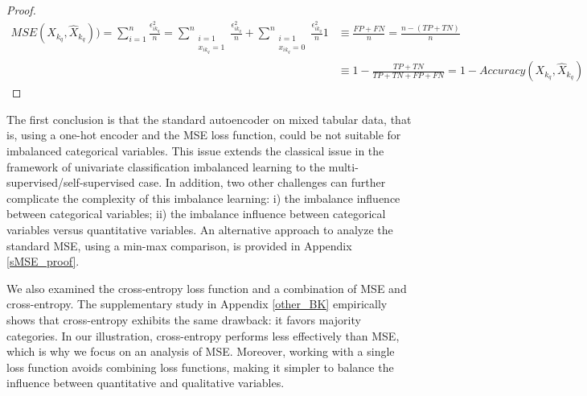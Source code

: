 \documentclass{article}
\def \w {\widehat}
\theoremstyle{definition}
\begin{document}
\begin{proof}
{\small
    \begin{align*}
        MSE(X_{k_q},  \w X_{k_q})) = \sum_{i=1}^n  \frac{\epsilon_{ik_q}^2}{n}  =  \underset{\substack{i=1 \\ x_{ik_q}=1}}{\sum^n}   \frac{\epsilon_{ik_q}^2}{n} + \underset{\substack{i=1 \\ x_{ik_q}=0}}{\sum^n}  \frac{\epsilon_{ik_q}^2}{n}  1 & \equiv \frac{FP + FN}{n} = \frac{n - (TP + TN)}{n} \\
        & \equiv  1-\frac{TP + TN}{TP + TN + FP + FN}   = 1 - Accuracy(X_{k_q}, \w X_{k_q})
    \end{align*}
}%
\end{proof}
The first conclusion is that the standard autoencoder on mixed tabular data, that is,  using a one-hot encoder and the MSE loss function, could be not suitable for imbalanced categorical variables. This issue extends the classical issue in the framework of univariate classification imbalanced learning to the multi-supervised/self-supervised case. 
In addition, two other challenges can further complicate the complexity of this imbalance learning: i) the imbalance influence between categorical variables; ii) the imbalance influence between categorical variables versus quantitative variables. 
An alternative approach to analyze the standard MSE, using a min-max comparison, is provided in Appendix \ref{sMSE_proof}.

We also examined the cross-entropy loss function and a combination of MSE and cross-entropy. The supplementary study in Appendix \ref{other_BK} empirically shows that cross-entropy exhibits the same drawback: it favors majority categories. In our illustration, cross-entropy performs less effectively than MSE, which is why we focus on an analysis of MSE. Moreover, working with a single loss function avoids combining loss functions, making it simpler to balance the influence between quantitative and qualitative variables.



\end{document}
